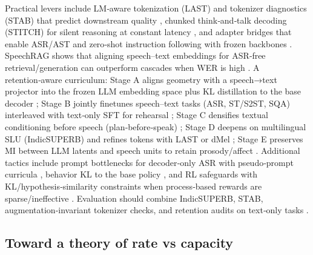 \documentclass{article}
\begin{document}
Practical levers include LM‑aware tokenization (LAST) and tokenizer diagnostics (STAB) that predict downstream quality \cite{turetzky2024lastlanguagemodelawarespeechtokenization,vashishth2024stabspeechtokenizerassessmentbenchmark}, chunked think‑and‑talk decoding (STITCH) for silent reasoning at constant latency \cite{chiang2025stitchsimultaneousthinkingtalkingchunked}, and adapter bridges that enable ASR/AST and zero‑shot instruction following with frozen backbones \cite{wang2023slmbridgethingapbetweenspeechtextfoundat}. SpeechRAG shows that aligning speech–text embeddings for ASR‑free retrieval/generation can outperform cascades when WER is high \cite{min2025speechretrievalaugmentedgenerationwithou}. A retention‑aware curriculum: Stage A aligns geometry with a speech→text projector into the frozen LLM embedding space plus KL distillation to the base decoder \cite{turetzky2024lastlanguagemodelawarespeechtokenization,wang2023slmbridgethingapbetweenspeechtextfoundat,hassid2024textuallypretrainedspeechlanguagemodels}; Stage B jointly finetunes speech–text tasks (ASR, ST/S2ST, SQA) interleaved with text‑only SFT for rehearsal \cite{peng2024mslms2stmultitaskspeechlanguagemodeltext,peng2025voicetextblenderaugmentinglargelanguagem,wang2023slmbridgethingapbetweenspeechtextfoundat}; Stage C densifies textual conditioning before speech (plan‑before‑speak) \cite{cui2025thinkbeforeyoutalkenhancingmeaningfuldia}; Stage D deepens on multilingual SLU (IndicSUPERB) and refines tokens with LAST or dMel \cite{entry2025indicsuperbspeechprocessinguniversalperf,turetzky2024lastlanguagemodelawarespeechtokenization,bai2025dmelspeechtokenizationmadesimple}; Stage E preserves MI between LLM latents and speech units to retain prosody/affect \cite{wang2025bossbeyondsemanticspeech}. Additional tactics include prompt bottlenecks for decoder‑only ASR with pseudo‑prompt curricula \cite{tsunoo2024decoderonlyarchitecturespeechrecognition}, behavior KL to the base policy \cite{wang2024blspemotowardsempatheticlargespeechlangu}, and RL safeguards with KL/hypothesis‑similarity constraints when process‑based rewards are sparse/ineffective \cite{li2025seewossubmissionmlcslmlessonslearnedspee}. Evaluation should combine IndicSUPERB, STAB, augmentation‑invariant tokenizer checks, and retention audits on text‑only tasks \cite{vashishth2024stabspeechtokenizerassessmentbenchmark,entry2025augmentationinvariantdiscreterepresentat,entry2025indicsuperbspeechprocessinguniversalperf}.

\subsection{Toward a theory of rate vs capacity} \label{subsec:Toward a theory of rate vs capacity}
\end{document}
